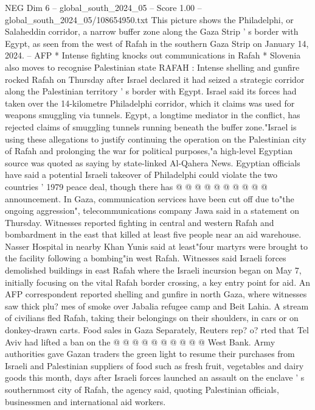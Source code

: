 \begin{textsample}{NEG Dim 6 – global\_south\_2024\_05 – Score 1.00 – global\_south\_2024\_05/108654950.txt}  \label{ex:f6_neg_292}
This picture shows the Philadelphi, or Salaheddin corridor, a narrow buffer zone along the Gaza Strip ' s border with Egypt, as seen from the west of Rafah in the southern Gaza Strip on January 14, 2024. -- AFP * Intense fighting knocks out communications in Rafah * Slovenia also moves to recognise Palestinian state RAFAH : Intense shelling and gunfire rocked Rafah on Thursday after Israel declared it had seized a strategic corridor along the Palestinian territory ' s border with Egypt.
Israel said its forces had taken over the 14-kilometre Philadelphi corridor, which it claims was used for weapons smuggling via tunnels.
Egypt, a longtime mediator in the conflict, has rejected claims of smuggling tunnels running beneath the buffer zone."Israel is using these allegations to justify continuing the operation on the Palestinian city of Rafah and prolonging the war for political purposes,"a high-level Egyptian source was quoted as saying by state-linked Al-Qahera News.
Egyptian officials have said a potential Israeli takeover of Philadelphi could violate the two countries ' 1979 peace deal, though there has @ @ @ @ @ @ @ @ @ @ announcement.
In Gaza, communication services have been cut off due to"the ongoing aggression", telecommunications company Jawa said in a statement on Thursday.
Witnesses reported fighting in central and western Rafah and bombardment in the east that killed at least five people near an aid warehouse.
Nasser Hospital in nearby Khan Yunis said at least"four martyrs were brought to the facility following a bombing"in west Rafah.
Witnesses said Israeli forces demolished buildings in east Rafah where the Israeli incursion began on May 7, initially focusing on the vital Rafah border crossing, a key entry point for aid.
An AFP correspondent reported shelling and gunfire in north Gaza, where witnesses saw thick plu? mes of smoke over Jabalia refugee camp and Beit Lahia.
A stream of civilians fled Rafah, taking their belongings on their shoulders, in cars or on donkey-drawn carts.
Food sales in Gaza Separately, Reuters rep? o? rted that Tel Aviv had lifted a ban on the @ @ @ @ @ @ @ @ @ @ West Bank.
Army authorities gave Gazan traders the green light to resume their purchases from Israeli and Palestinian suppliers of food such as fresh fruit, vegetables and dairy goods this month, days after Israeli forces launched an assault on the enclave ' s southernmost city of Rafah, the agency said, quoting Palestinian officials, businessmen and international aid workers.

\end{textsample}
